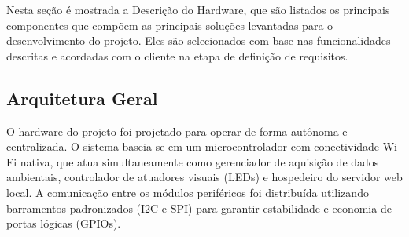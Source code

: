 

Nesta seção é mostrada a Descrição do Hardware, que são listados os principais componentes que compõem as principais soluções levantadas para o desenvolvimento do projeto. Eles são selecionados com base nas funcionalidades descritas e acordadas com o cliente na etapa de definição de requisitos. 

\subsection{Arquitetura Geral}
O hardware do projeto foi projetado para operar de forma autônoma e centralizada. O sistema baseia-se em um microcontrolador com conectividade Wi-Fi nativa, que atua simultaneamente como gerenciador de aquisição de dados ambientais, controlador de atuadores visuais (LEDs) e hospedeiro do servidor web local. A comunicação entre os módulos periféricos foi distribuída utilizando barramentos padronizados (I2C e SPI) para garantir estabilidade e economia de portas lógicas (GPIOs).


